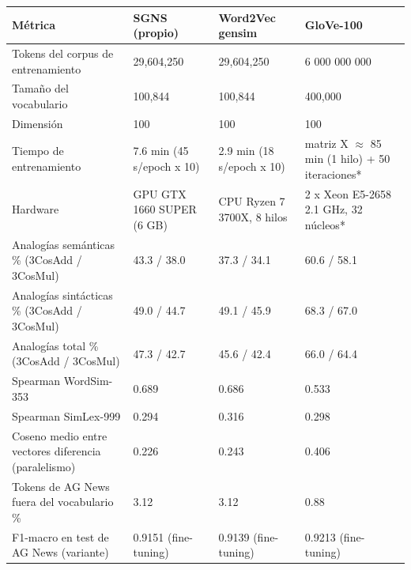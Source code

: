 \begin{tabular}{p{5.6cm}lll}
\toprule
Métrica & SGNS (propio) & Word2Vec gensim & GloVe-100 \\
\midrule
Tokens del corpus de entrenamiento & 29,604,250 & 29,604,250 & 6 000 000 000 \\
Tamaño del vocabulario & 100,844 & 100,844 & 400,000 \\
Dimensión & 100 & 100 & 100 \\
Tiempo de entrenamiento & 7.6 min (45 s/epoch x 10) & 2.9 min (18 s/epoch x 10) & matriz X $\approx$ 85 min (1 hilo) + 50 iteraciones* \\
Hardware & GPU GTX 1660 SUPER (6 GB) & CPU Ryzen 7 3700X, 8 hilos & 2 x Xeon E5-2658 2.1 GHz, 32 núcleos* \\
Analogías semánticas \% (3CosAdd / 3CosMul) & 43.3 / 38.0 & 37.3 / 34.1 & 60.6 / 58.1 \\
Analogías sintácticas \% (3CosAdd / 3CosMul) & 49.0 / 44.7 & 49.1 / 45.9 & 68.3 / 67.0 \\
Analogías total \% (3CosAdd / 3CosMul) & 47.3 / 42.7 & 45.6 / 42.4 & 66.0 / 64.4 \\
Spearman WordSim-353 & 0.689 & 0.686 & 0.533 \\
Spearman SimLex-999 & 0.294 & 0.316 & 0.298 \\
Coseno medio entre vectores diferencia (paralelismo) & 0.226 & 0.243 & 0.406 \\
Tokens de AG News fuera del vocabulario \% & 3.12 & 3.12 & 0.88 \\
F1-macro en test de AG News (variante) & 0.9151 (fine-tuning) & 0.9139 (fine-tuning) & 0.9213 (fine-tuning) \\
\bottomrule
\end{tabular}